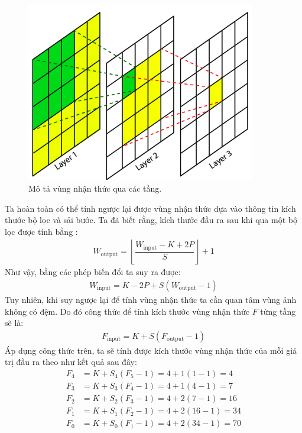 \documentclass[a4paper, 12pt]{article}
\begin{document}
\begin{figure}[!h]
\captionsetup{width=0.8\textwidth}
\centering
\includegraphics[width=10cm]{images/3_3.png}
\caption{Mô tả vùng nhận thức qua các tầng.}
\end{figure}

\noindent
Ta hoàn toàn có thể tính ngược lại được vùng nhận thức dựa vào thông tin kích thước bộ lọc và sải bước. Ta đã biết rằng, kích thước đầu ra sau khi qua một bộ lọc được tính bằng \cite{replycalcnnsize}:
\begin{align*}
    W_{\text{output}} = \left\lfloor\dfrac{W_{\text{input}} - K + 2P}{S}\right\rfloor + 1
\end{align*}
Như vậy, bằng các phép biến đổi ta suy ra được:
\begin{align*}
    W_{\text{input}} = K - 2P + S\left(W_{\text{output}} - 1\right)
\end{align*}
Tuy nhiên, khi suy ngược lại để tính vùng nhận thức ta cần quan tâm vùng ảnh không có đệm. Do đó công thức để tính kích thước vùng nhận thức $F$ từng tầng sẽ là:
\begin{align*}
    F_{\text{input}} = K + S\left(F_{\text{output}} - 1\right)
\end{align*}
Áp dụng công thức trên, ta sẽ tính được kích thước vùng nhận thức của mỗi giá trị đầu ra theo như kết quả sau đây:
\begin{align*}
    F_4 &= K + S_4(F_5 - 1) = 4 + 1(1-1) = 4\\
    F_3 &= K + S_3(F_4 - 1) = 4 + 1(4-1) = 7\\
    F_2 &= K + S_2(F_3 - 1) = 4 + 2(7-1) = 16\\
    F_1 &= K + S_1(F_2 - 1) = 4 + 2(16-1) = 34\\
    F_0 &= K + S_0(F_1 - 1) = 4 + 2(34 - 1) = 70
\end{align*}
\end{document}

